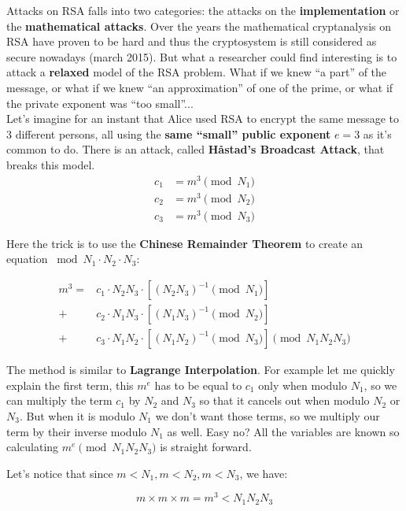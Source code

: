 \documentclass[a4paper,11pt]{article}
\begin{document}
Attacks on RSA falls into two categories: the attacks on the \textbf{implementation} or the \textbf{mathematical attacks}. Over the years the mathematical cryptanalysis on RSA have proven to be hard and thus the cryptosystem is still considered as secure nowadays (march 2015). But what a researcher could find interesting is to attack a \textbf{relaxed} model of the RSA problem. What if we knew ``a part'' of the message, or what if we knew ``an approximation'' of one of the prime, or what if the private exponent was ``too small''...\\

Let's imagine for an instant that Alice used RSA to encrypt the same message to 3 different persons, all using the \textbf{same ``small'' public exponent} $e = 3$ as it's common to do. There is an attack, called \textbf{Håstad's Broadcast Attack}, that breaks this model.\\


\begin{align*}
	c_1 &= m^3 \pmod{N_1}\\
	c_2 &= m^3 \pmod{N_2}\\
	c_3 &= m^3 \pmod{N_3}
\end{align*}

Here the trick is to use the \textbf{Chinese Remainder Theorem} to create an equation $\bmod{N_1 \cdot N_2 \cdot N_3}$:

\begin{align*}
	m^3 = &c_1 \cdot N_2 N_3 \cdot [(N_2 N_3)^{-1} \pmod{N_1}] \\
			 + &c_2 \cdot N_1 N_3 \cdot [(N_1 N_3)^{-1} \pmod{N_2}] \\
			 + &c_3 \cdot N_1 N_2 \cdot [(N_1 N_2)^{-1} \pmod{N_3}] 
			 \pmod{N_1 N_2 N_3}
\end{align*}

The method is similar to \textbf{Lagrange Interpolation}. For example let me quickly explain the first term, this $m^e$ has to be equal to $c_1$ only when modulo $N_1$, so we can multiply the term $c_1$ by $N_2$ and $N_3$ so that it cancels out when modulo $N_2$ or $N_3$. But when it is modulo $N_1$ we don't want those terms, so we multiply our term by their inverse modulo $N_1$ as well. Easy no? All the variables are known so calculating $m^e \pmod{N_1 N_2 N_3}$ is straight forward.

Let's notice that since  $m < N_1, m < N_2, m < N_3$, we have:

\[ m \times m \times m = m^3 < N_1 N_2 N_3 \]
\end{document}

